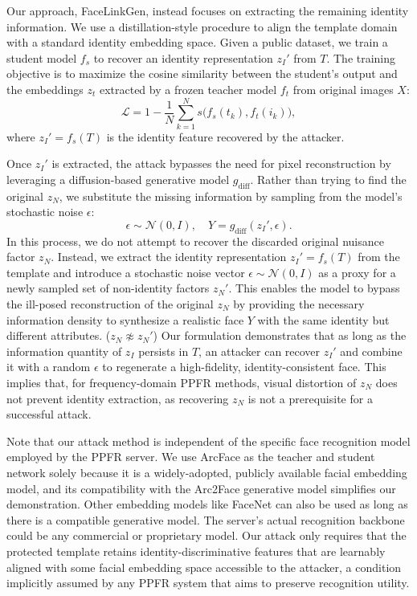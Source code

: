 Our approach, FaceLinkGen, instead focuses on extracting the remaining identity information. We use a distillation-style procedure to align the template domain with a standard identity embedding space. Given a public dataset, we train a student model $f_s$ to recover an identity representation $z_I'$ from $T$. The training objective is to maximize the cosine similarity between the student's output and the embeddings $z_t$ extracted by a frozen teacher model $f_t$ from original images $X$:
\begin{equation}
\mathcal{L} = 1 - \frac{1}{N}\sum_{k=1}^{N} s\bigl(f_s(t_k), f_t(i_k)\bigr),
\end{equation}
where $z_I' = f_s(T)$ is the identity feature recovered by the attacker. 

Once $z_I'$ is extracted, the attack bypasses the need for pixel reconstruction by leveraging a diffusion-based generative model $g_{\mathrm{diff}}$. Rather than trying to find the original $z_N$, we substitute the missing information by sampling from the model's stochastic noise $\epsilon$:
\begin{equation}
\epsilon \sim \mathcal{N}(0, I), \quad
Y = g_{\mathrm{diff}}(z_I', \epsilon).
\end{equation}
In this process, we do not attempt to recover the discarded original nuisance factor $z_N$. Instead, we extract the identity representation $z_I' = f_s(T)$ from the template and introduce a stochastic noise vector $\epsilon \sim \mathcal{N}(0, I)$ as a proxy for a newly sampled set of non-identity factors $z_N'$. This enables the model to bypass the ill-posed reconstruction of the original $z_N$ by providing the necessary information density to synthesize a realistic face $Y$ with the same identity but different attributes. ($z_N \not\approx z_N'$) Our formulation demonstrates that as long as the information quantity of $z_I$ persists in $T$, an attacker can recover $z_I'$ and combine it with a random $\epsilon$ to regenerate a high-fidelity, identity-consistent face. This implies that, for frequency-domain PPFR methods, visual distortion of $z_N$ does not prevent identity extraction, as recovering $z_N$ is not a prerequisite for a successful attack.

Note that our attack method is independent of the specific face recognition model employed by the PPFR server. We use ArcFace as the teacher and student network solely because it is a widely-adopted, publicly available facial embedding model, and its compatibility with the Arc2Face generative model simplifies our demonstration. Other embedding models like FaceNet \cite{schroff_facenet_2015} can also be used as long as there is a compatible generative model. The server's actual recognition backbone could be any commercial or proprietary model. Our attack only requires that the protected template retains identity-discriminative features that are learnably aligned with some facial embedding space accessible to the attacker, a condition implicitly assumed by any PPFR system that aims to preserve recognition utility.

